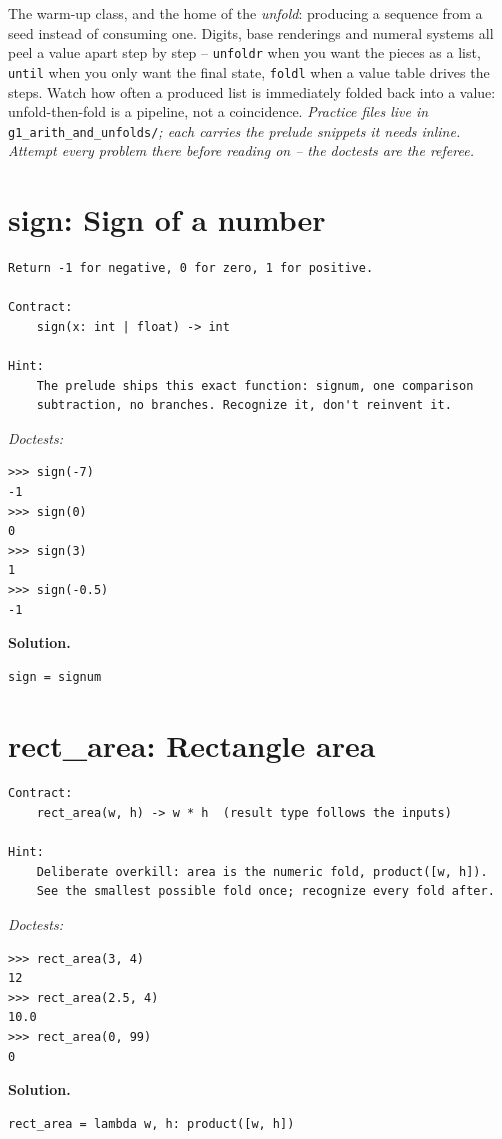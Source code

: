 \documentclass[11pt,letterpaper]{book}
\begin{document}
The warm-up class, and the home of the \emph{unfold}: producing a sequence from
a seed instead of consuming one. Digits, base renderings and numeral systems all
peel a value apart step by step -- \texttt{unfoldr} when you want the pieces as
a list, \texttt{until} when you only want the final state, \texttt{foldl} when
a value table drives the steps. Watch how often a produced list is immediately
folded back into a value: unfold-then-fold is a pipeline, not a coincidence.
\medskip\noindent\textit{Practice files live in }\texttt{g1\_arith\_and\_unfolds/}\textit{;
each carries the prelude snippets it needs inline. Attempt every problem there
before reading on -- the doctests are the referee.}

\section{sign: Sign of a number}
\begin{lstlisting}[style=spec]
Return -1 for negative, 0 for zero, 1 for positive.

Contract:
    sign(x: int | float) -> int

Hint:
    The prelude ships this exact function: signum, one comparison
    subtraction, no branches. Recognize it, don't reinvent it.
\end{lstlisting}
\noindent\textit{Doctests:}
\begin{lstlisting}[style=spec]
>>> sign(-7)
-1
>>> sign(0)
0
>>> sign(3)
1
>>> sign(-0.5)
-1
\end{lstlisting}
\noindent\textbf{Solution.}
\begin{lstlisting}[style=code]
sign = signum
\end{lstlisting}

\section{rect\_area: Rectangle area}
\begin{lstlisting}[style=spec]
Contract:
    rect_area(w, h) -> w * h  (result type follows the inputs)

Hint:
    Deliberate overkill: area is the numeric fold, product([w, h]).
    See the smallest possible fold once; recognize every fold after.
\end{lstlisting}
\noindent\textit{Doctests:}
\begin{lstlisting}[style=spec]
>>> rect_area(3, 4)
12
>>> rect_area(2.5, 4)
10.0
>>> rect_area(0, 99)
0
\end{lstlisting}
\noindent\textbf{Solution.}
\begin{lstlisting}[style=code]
rect_area = lambda w, h: product([w, h])
\end{lstlisting}
\end{document}
